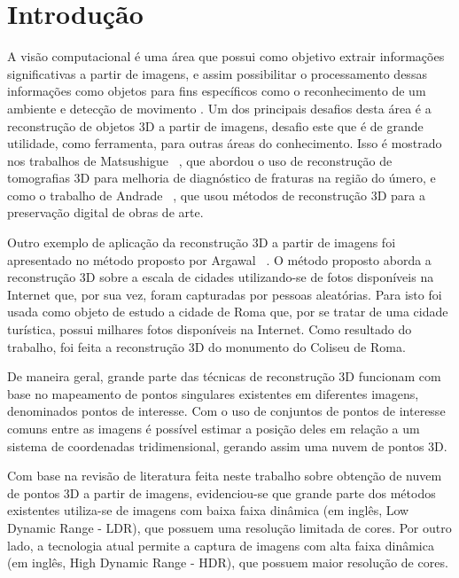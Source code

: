 \chapter{Introdução} \label{introducao}
A visão computacional é uma área que possui como objetivo extrair informações significativas a partir de imagens, e assim possibilitar o processamento dessas informações como objetos para fins específicos como o reconhecimento de um ambiente e detecção de movimento \cite{ballard&brown}. Um dos principais desafios desta área é a reconstrução de objetos 3D a partir de imagens, desafio este que é de grande utilidade, como ferramenta, para outras áreas do conhecimento. Isso é mostrado nos trabalhos de Matsushigue \etal~\cite{matsushigue}, que abordou o uso de reconstrução de tomografias 3D para melhoria de diagnóstico de fraturas na região do úmero, e como o trabalho de Andrade \etal~\cite{beatriz}, que usou métodos de reconstrução 3D para a preservação digital de obras de arte.


Outro exemplo de aplicação da reconstrução 3D a partir de imagens foi apresentado no método proposto por Argawal \etal~\cite{agarwal}. O método proposto aborda a reconstrução 3D sobre a escala de cidades utilizando-se de fotos disponíveis na Internet que, por sua vez, foram capturadas por pessoas aleatórias. Para isto foi usada como objeto de estudo a cidade de Roma que, por se tratar de uma cidade turística, possui milhares fotos disponíveis na Internet. Como resultado do trabalho, foi feita a reconstrução 3D do monumento do Coliseu de Roma.


De maneira geral, grande parte das técnicas de reconstrução 3D funcionam com base no mapeamento de pontos singulares existentes em diferentes imagens, denominados pontos de interesse. Com o uso de conjuntos de pontos de interesse comuns entre as imagens é possível estimar a posição deles em relação a um sistema de coordenadas tridimensional, gerando assim uma nuvem de pontos 3D.


Com base na revisão de literatura feita neste trabalho sobre obtenção de nuvem de pontos 3D a partir de imagens, evidenciou-se que grande parte dos métodos existentes utiliza-se de imagens com baixa faixa dinâmica (em inglês, Low Dynamic Range - LDR), que possuem uma resolução limitada de cores. Por outro lado, a tecnologia atual permite a captura de imagens com alta faixa dinâmica (em inglês, High Dynamic Range - HDR), que possuem maior resolução de cores.

